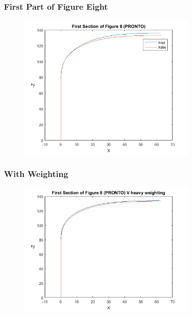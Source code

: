 \documentclass{beamer}
\begin{document}
    \begin{frame}
        \frametitle{First Part of Figure Eight}
        \begin{figure}
            \centering
            \includegraphics[width=0.8\textwidth]{first_section.png}
        \end{figure}
    \end{frame}
    \begin{frame}
        \frametitle{With Weighting}
        \begin{figure}
            \centering
            \includegraphics[width=0.8\textwidth]{first_section_weight.png}
        \end{figure}
    \end{frame}
\end{document}
